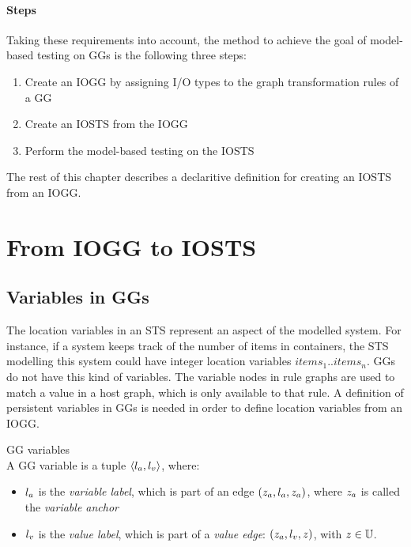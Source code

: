 \paragraph*{Steps} Taking these requirements into account, the method to achieve the goal of model-based testing on GGs is the following three steps:
\begin{enumerate}
\item Create an IOGG by assigning I/O types to the graph transformation rules of a GG
\item Create an IOSTS from the IOGG
\item Perform the model-based testing on the IOSTS
\end{enumerate}
The rest of this chapter describes a declaritive definition for creating an IOSTS from an IOGG.

\section{From IOGG to IOSTS}\label{sec:algorithm}
\subsection{Variables in GGs} 
The location variables in an STS represent an aspect of the modelled system. For instance, if a system keeps track of the number of items in containers, the STS modelling this system could have integer location variables $\mathit{items}_1..\mathit{items}_n$. GGs do not have this kind of variables. The variable nodes in rule graphs are used to match a value in a host graph, which is only available to that rule. A definition of persistent variables in GGs is needed in order to define location variables from an IOGG.

\vspace{10px}
\begin{definition}\label{def:gg_vars} GG variables \\
A GG variable is a tuple $\langle l_a, l_v\rangle$, where:
\begin{itemize}
\item {}$l_a$ is the \textit{variable label}, which is part of an edge $(z_a, l_a, z_a)$, where $z_a$ is called the \textit{variable anchor}
\item {}$l_v$ is the \textit{value label}, which is part of a \textit{value edge}: $(z_a, l_v, z)$, with $z \in \mathbb{U}$.
\end{itemize}
\end{definition}
\vspace{10px}

